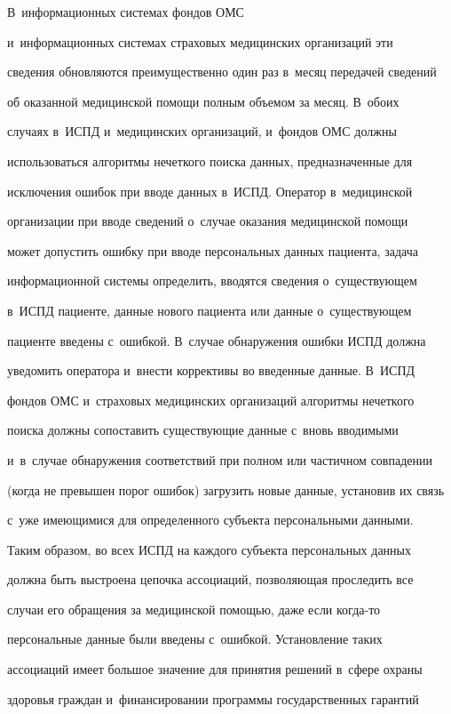 В~информационных системах фондов ОМС


и~информационных системах страховых медицинских организаций эти 


сведения обновляются преимущественно один раз в~месяц передачей сведений 


об оказанной медицинской помощи полным объемом за месяц. В~обоих 


случаях в~ИСПД и~медицинских организаций, и~фондов ОМС должны 


использоваться алгоритмы нечеткого поиска данных, предназначенные для 


исключения ошибок при вводе данных в~ИСПД. Оператор в~медицинской 


организации при вводе сведений о~случае оказания медицинской помощи 


может допустить ошибку при вводе персональных данных пациента, задача 


информационной системы определить, вводятся сведения о~существующем 


в~ИСПД пациенте, данные нового пациента или данные о~существующем 


пациенте введены с~ошибкой. В~случае обнаружения ошибки ИСПД должна 


уведомить оператора и~внести коррективы во введенные данные. В~ИСПД 


фондов ОМС и~страховых медицинских организаций алгоритмы нечеткого 


поиска должны сопоставить существующие данные с~вновь вводимыми 


и~в~случае обнаружения соответствий при полном или частичном совпадении 


(когда не превышен порог ошибок) загрузить новые данные, установив их связь 


с~уже имеющимися для определенного субъекта персональными данными. 


Таким образом, во всех ИСПД на каждого субъекта персональных данных 


должна быть выстроена цепочка ассоциаций, позволяющая проследить все 


случаи его обращения за медицинской помощью, даже если когда-то 


персональные данные были введены с~ошибкой. Установление таких 


ассоциаций имеет большое значение для принятия решений в~сфере охраны 


здоровья граждан и~финансировании программы государственных гарантий 


